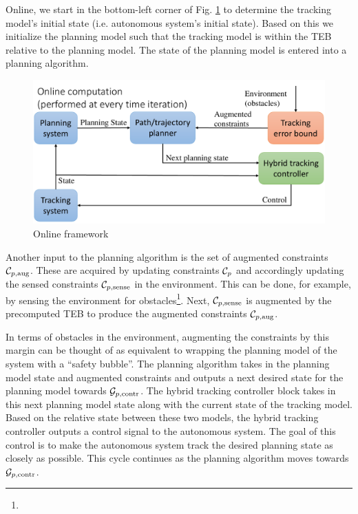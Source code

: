 Online, we start in the bottom-left corner of Fig. \ref{fig:fw_online} to determine the tracking model's initial state (i.e. autonomous system's initial state). Based on this we initialize the planning model such that the tracking model is within the TEB relative to the planning model. The state of the planning model is entered into a planning algorithm.  
\begin{figure}[h!]
	\centering
	\includegraphics[width=1\columnwidth]{fig/framework_online}
	\caption{Online framework }
	\label{fig:fw_online}
\end{figure}
Another input to the planning algorithm is the set of augmented constraints $\mathcal C_{p,\text{aug}}$.  These are acquired by updating constraints $\mathcal C_p$ and accordingly updating the sensed constraints $\mathcal C_{p,\text{sense}}$ in the environment.  This can be done, for example, by sensing the environment for obstacles\footnote{}. Next, $\mathcal C_{p,\text{sense}}$ is augmented  by the precomputed TEB to produce the augmented constraints $\mathcal C_{p,\text{aug}}$. 



In terms of obstacles in the environment, augmenting the constraints by this margin can be thought of as equivalent to wrapping the planning model of the system with a ``safety bubble''. 
The planning algorithm takes in the planning model state and augmented constraints and outputs a next desired state for the planning model towards $\mathcal G_{p,\text{contr}}$.
The hybrid tracking controller block takes in this next planning model state along with the current state of the tracking model.
Based on the relative state between these two models, the hybrid tracking controller outputs a control signal to the autonomous system. 
The goal of this control is to make the autonomous system track the desired planning state as closely as possible.
This cycle continues as the planning algorithm moves towards $\mathcal G_{p,\text{contr}}$.

